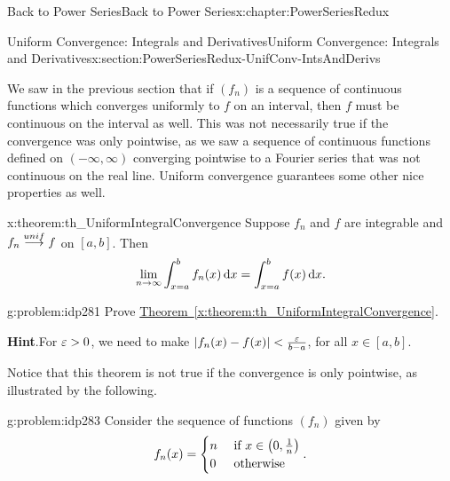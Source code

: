 \begin{chapterptx}{Back to Power Series}{}{Back to Power Series}{}{}{x:chapter:PowerSeriesRedux}
	\typeout{************************************************}
	\typeout{************************************************}
	\begin{sectionptx}{Uniform Convergence: Integrals and Derivatives}{}{Uniform Convergence: Integrals and Derivatives}{}{}{x:section:PowerSeriesRedux-UnifConv-IntsAndDerivs}
		\begin{introduction}{}%
			We saw in the previous section that if \(\left(f_n\right)\) is a sequence of continuous functions which converges uniformly to \(f\) on an interval, then \(f\) must be continuous on the interval as well. This was not necessarily true if the convergence was only pointwise, as we saw a sequence of continuous functions defined on \((-\infty,\infty)\) converging pointwise to a Fourier series that was not continuous on the real line. Uniform convergence guarantees some other nice properties as well.%
			\begin{theorem}{}{}{x:theorem:th_UniformIntegralConvergence}%
				 Suppose \(f_n\) and \(f\) are integrable and \(f_n\stackrel{unif}{\longrightarrow} f\) on \([a,b]\). Then%
				\begin{equation*}
					\lim_{n\rightarrow\infty}\int_{x=a}^b f_n(x)\,{\rm d} x=\int_{x=a}^bf(x)\,{\rm d} x. {}
				\end{equation*}
			\end{theorem}
			\begin{problem}{}{g:problem:idp281}%
				 Prove \hyperref[x:theorem:th_UniformIntegralConvergence]{Theorem~{\xreffont\ref{x:theorem:th_UniformIntegralConvergence}}}.%
				\par\smallskip%
				\noindent\textbf{\blocktitlefont Hint}.\hypertarget{g:hint:idp282}{}\quad{}For \(\varepsilon>0\), we need to make \(|f_n(x)-f(x)|< \frac{\varepsilon}{b-a}\), for all \(x\in[a,b]\).%
			\end{problem}
			Notice that this theorem is not true if the convergence is only pointwise, as illustrated by the following.%
			\begin{problem}{}{g:problem:idp283}%
				 Consider the sequence of functions \(\left(f_n\right)\) given by%
				\begin{equation*}
					f_n(x)= \begin{cases}n\amp \text{ if } x\in\left(0,\frac{1}{n}\right)\\ 0\amp \text{ otherwise } \end{cases} \text{.}

\end{equation*}
\end{problem}
\end{introduction}
\end{sectionptx}
\end{chapterptx}
